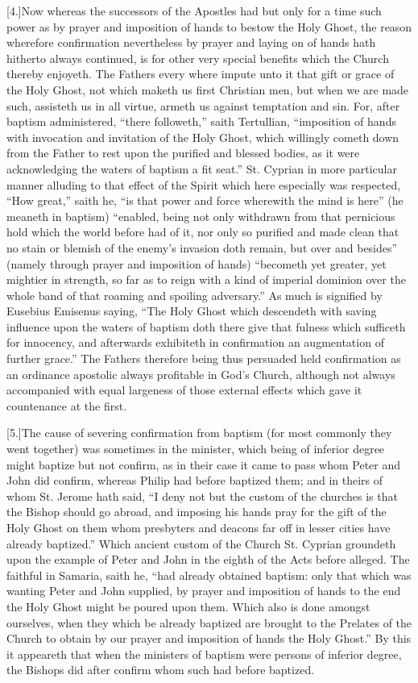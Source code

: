 [4.]Now whereas the successors of the Apostles had but only for a time such power as by prayer and imposition of hands to bestow the Holy Ghost, the reason wherefore confirmation nevertheless by prayer and laying on of hands hath hitherto always continued, is for other very special benefits which the Church thereby enjoyeth. The Fathers every where impute unto it that gift or grace of the Holy Ghost, not which maketh us first Christian men, but when we are made such, assisteth us in all virtue, armeth us against temptation and sin. For, after baptism administered, “there followeth,” saith Tertullian, “imposition of hands with invocation and invitation of the Holy Ghost, which willingly cometh down from the Father to rest upon the purified and blessed bodies, as it were acknowledging the waters of baptism a fit seat.” St. Cyprian in more particular manner alluding to that effect of the Spirit which here especially was respected, “How great,” saith he, “is that power and force wherewith the mind is here” (he meaneth in baptism) “enabled, being not only withdrawn from that pernicious hold which the world before had of it, nor only so purified and made clean that no stain or blemish of the enemy’s invasion doth remain, but over and besides” (namely through prayer and imposition of  hands) “becometh yet greater,
 yet mightier in strength, so far as to reign with a kind of imperial dominion over the whole band of that roaming and spoiling adversary.” As much is signified by Eusebius Emisenus saying, “The Holy Ghost which descendeth with saving influence upon the waters of baptism doth there give that fulness which sufficeth for innocency, and afterwards exhibiteth in confirmation an augmentation of further grace.” The Fathers therefore being thus persuaded held confirmation as an ordinance apostolic always profitable in God’s Church, although not always accompanied with equal largeness of those external effects which gave it countenance at the first.

[5.]The cause of severing confirmation from baptism (for most commonly they went together) was sometimes in the minister, which being of inferior degree might baptize but not confirm, as in their case it came to pass whom Peter and John did confirm, whereas Philip had before baptized them; and in theirs of whom St. Jerome hath said, “I deny not but the custom of the churches is that the Bishop should go abroad, and imposing his hands pray for the gift of the Holy Ghost on them whom presbyters and deacons far off in lesser cities have already baptized.” Which ancient custom of the Church St. Cyprian groundeth upon the example of Peter and John in the eighth of the Acts before  alleged.
 The faithful in Samaria, saith he, “had already obtained baptism: only that which was wanting Peter and John supplied, by prayer and imposition of hands to the end the Holy Ghost might be poured upon them. Which also is done amongst ourselves, when they which be already baptized are brought to the Prelates of the Church to obtain by our prayer and imposition of hands the Holy Ghost.” By this it appeareth that when the ministers of baptism were persons of inferior degree, the Bishops did after confirm whom such had before baptized.

